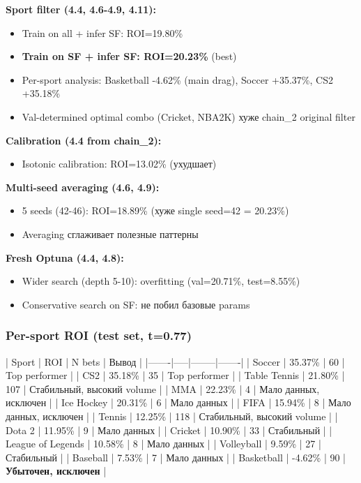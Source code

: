 \documentclass[12pt,a4paper]{article}
\begin{document}
\textbf{Sport filter (4.4, 4.6-4.9, 4.11):}
\begin{itemize}
  \item Train on all + infer SF: ROI=19.80\%
  \item \textbf{Train on SF + infer SF: ROI=20.23\%} (best)
  \item Per-sport analysis: Basketball -4.62\% (main drag), Soccer +35.37\%, CS2 +35.18\%
  \item Val-determined optimal combo (Cricket, NBA2K) хуже chain\_2 original filter
\end{itemize}

\textbf{Calibration (4.4 from chain\_2):}
\begin{itemize}
  \item Isotonic calibration: ROI=13.02\% (ухудшает)
\end{itemize}

\textbf{Multi-seed averaging (4.6, 4.9):}
\begin{itemize}
  \item 5 seeds (42-46): ROI=18.89\% (хуже single seed=42 = 20.23\%)
  \item Averaging сглаживает полезные паттерны
\end{itemize}

\textbf{Fresh Optuna (4.4, 4.8):}
\begin{itemize}
  \item Wider search (depth 5-10): overfitting (val=20.71\%, test=8.55\%)
  \item Conservative search on SF: не побил базовые params
\end{itemize}

\subsubsection{Per-sport ROI (test set, t=0.77)}

| Sport | ROI | N bets | Вывод |
|-------|-----|--------|-------|
| Soccer | 35.37\% | 60 | Top performer |
| CS2 | 35.18\% | 35 | Top performer |
| Table Tennis | 21.80\% | 107 | Стабильный, высокий volume |
| MMA | 22.23\% | 4 | Мало данных, исключен |
| Ice Hockey | 20.31\% | 6 | Мало данных |
| FIFA | 15.94\% | 8 | Мало данных, исключен |
| Tennis | 12.25\% | 118 | Стабильный, высокий volume |
| Dota 2 | 11.95\% | 9 | Мало данных |
| Cricket | 10.90\% | 33 | Стабильный |
| League of Legends | 10.58\% | 8 | Мало данных |
| Volleyball | 9.59\% | 27 | Стабильный |
| Baseball | 7.53\% | 7 | Мало данных |
| Basketball | -4.62\% | 90 | \textbf{Убыточен, исключен} |
\end{document}
